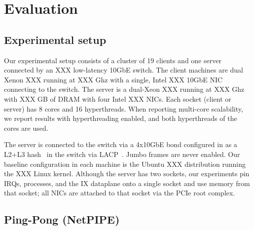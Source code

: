 
\section{Evaluation}
\label{sec:eval}

\subsection{Experimental setup}
\label{sec:eval:setup}


Our experimental setup consists of a cluster of 19 clients and one
server connected by an XXX low-latency 10GbE switch.  The client
machines are dual Xenon XXX running at XXX Ghz with a single, Intel
XXX 10GbE NIC connecting to the switch.  The server is a dual-Xeon XXX
running at XXX Ghz with XXX GB of DRAM with four Intel XXX NICs.  Each
socket (client or server) has 8 cores and 16 hyperthreads.  When
reporting multi-core scalability, we report results with
hyperthreading enabled, and both hyperthreads of the cores are used.

The server is connected to
the switch via a 4x10GbE bond configured in as a L2+L3
hash~\cite{missing} in the switch via LACP~\cite{ieee802.3ad}.  Jumbo
frames are never enabled.  Our baseline configuration in each machine
is the Ubuntu XXX distribution running the XXX Linux kernel.  Although
the server has two sockets, our experiments pin IRQs, processes, and
the IX dataplane onto a single socket and use memory from that socket;
all NICs are attached to that socket via the PCIe root complex.


\subsection{Ping-Pong (NetPIPE)}




